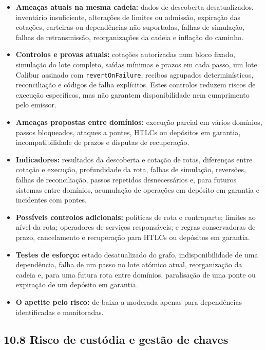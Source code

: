 \documentclass[11pt]{article}
\begin{document}
\begin{itemize}[leftmargin=*]
\item \textbf{Ameaças atuais na mesma cadeia:} dados de descoberta desatualizados, inventário insuficiente, alterações de limites ou admissão, expiração das cotações, carteiras ou dependências não suportadas, falhas de simulação, falhas de retransmissão, reorganizações da cadeia e inflação do caminho.
\item \textbf{Controlos e provas atuais:} cotações autorizadas num bloco fixado, simulação do lote completo, saídas mínimas e prazos em cada passo, um lote Calibur assinado com \texttt{revertOnFailure}, recibos agrupados determinísticos, reconciliação e códigos de falha explícitos. Estes controlos reduzem riscos de execução específicos, mas não garantem disponibilidade nem cumprimento pelo emissor.
\item \textbf{Ameaças propostas entre domínios:} execução parcial em vários domínios, passos bloqueados, ataques a pontes, HTLCs ou depósitos em garantia, incompatibilidade de prazos e disputas de recuperação.
\item \textbf{Indicadores:} resultados da descoberta e cotação de rotas, diferenças entre cotação e execução, profundidade da rota, falhas de simulação, reversões, falhas de reconciliação, passos repetidos desnecessários e, para futuros sistemas entre domínios, acumulação de operações em depósito em garantia e incidentes com pontes.
\item \textbf{Possíveis controlos adicionais:} políticas de rota e contraparte; limites ao nível da rota; operadores de serviços responsáveis; e regras conservadoras de prazo, cancelamento e recuperação para HTLCs ou depósitos em garantia.
\item \textbf{Testes de esforço:} estado desatualizado do grafo, indisponibilidade de uma dependência, falha de um passo no lote atómico atual, reorganização da cadeia e, para uma futura rota entre domínios, paralisação de uma ponte ou expiração de um depósito em garantia.
\item \textbf{O apetite pelo risco:} de baixa a moderada apenas para dependências identificadas e monitoradas.
\end{itemize}
\subsection*{10.8 Risco de custódia e gestão de chaves}
\end{document}
